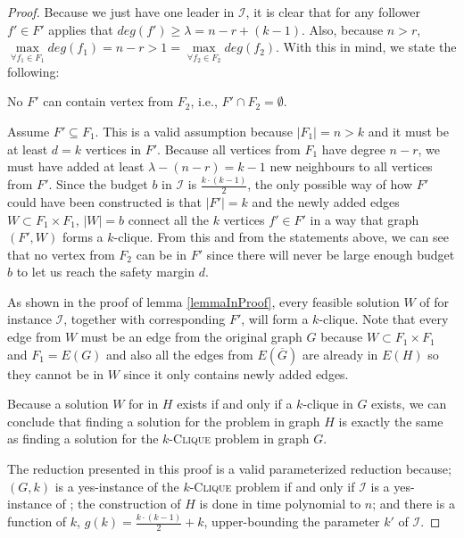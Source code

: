 \begin{proof}
    Because we just have one leader in $\mathcal{I}$, it is clear that for any follower $f' \in F'$ applies that
    $deg(f') \geq \lambda = n - r + (k - 1)$.
    Also, because $n > r$, $\max\limits_{\forall f_1 \in F_1}deg(f_1) = n-r > 1 = \max\limits_{\forall f_2 \in F_2}deg(f_2)$.
    With this in mind, we state the following:

    \begin{lemma}\label{lemmaInProof}
        No $F'$ can contain vertex from $F_2$, i.e., $F' \cap F_2 = \emptyset$.
    \end{lemma}
    \begin{subproof}
        Assume $F' \subseteq F_1$. This is a valid assumption because $|F_1| = n > k$ and it must be at least $d = k$ vertices in $F'$.
        Because all vertices from $F_1$ have degree $n-r$, we must have added at least $\lambda - (n - r) = k - 1$ new neighbours to all vertices from $F'$.
        Since the budget $b$ in $\mathcal{I}$ is $\frac{k\cdot(k-1)}{2}$,
        the only possible way of how $F'$ could have been constructed is that $|F'|=k$ and the newly added edges $W \subset F_1 \times F_1$, $|W| = b$
        connect all the $k$ vertices $f' \in F'$ in a way that graph $(F', W)$ forms a $k$-clique.
        From this and from the statements above, we can see that no vertex from $F_2$ can be in $F'$
        since there will never be large enough budget $b$ to let us reach the safety margin $d$.
    \end{subproof}

    As shown in the proof of lemma \ref{lemmaInProof}, every feasible solution $W$ of \HLshort for instance $\mathcal{I}$, together with corresponding $F'$,
    will form a $k$-clique.
    Note that every edge from $W$ must be an edge from the original graph $G$ because $W \subset F_1 \times F_1$ and $F_1 = E(G)$
    and also all the edges from $E(\overline{G})$ are already in $E(H)$ so they cannot be in $W$ since it only contains newly added edges.

    Because a solution $W$ for \HLshort in $H$ exists if and only if a $k$-clique in $G$ exists,
    we can conclude that finding a solution for the \HL problem in graph $H$ is exactly the same as
    finding a solution for the $k$-\textsc{Clique} problem in graph $G$.

    The reduction presented in this proof is a valid parameterized reduction because;
    $(G, k)$ is a yes-instance of the $k$-\textsc{Clique} problem if and only if $\mathcal{I}$ is a yes-instance of \HLshort;
    the construction of $H$ is done in time polynomial to $n$;
    and there is a function of $k$, $g(k) = \frac{k\cdot(k-1)}{2} + k$, upper-bounding the parameter $k'$ of $\mathcal{I}$.
\end{proof}

